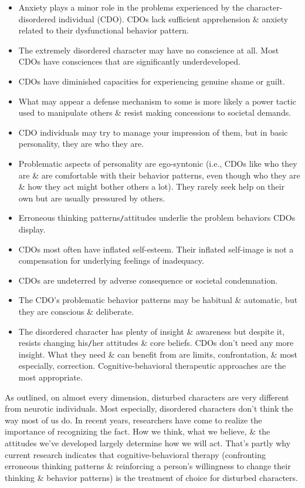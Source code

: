 \documentclass{article}
\numberwithin{equation}{section}
\begin{document}
\begin{itemize}
	\item Anxiety plays a minor role in the problems experienced by the character-disordered individual (CDO). CDOs lack sufficient apprehension \& anxiety related to their dysfunctional behavior pattern.
	\item The extremely disordered character may have no conscience at all. Most CDOs have consciences that are significantly underdeveloped.
	\item CDOs have diminished capacities for experiencing genuine shame or guilt.
	\item What may appear a defense mechanism to some is more likely a power tactic used to manipulate others \& resist making concessions to societal demands.
	\item CDO individuals may try to manage your impression of them, but in basic personality, they are who they are.
	\item Problematic aspects of personality are ego-syntonic (i.e., CDOs like who they are \& are comfortable with their behavior patterns, even though who they are \& how they act might bother others a lot). They rarely seek help on their own but are usually pressured by others.
	\item Erroneous thinking patterns\texttt{/}attitudes underlie the problem behaviors CDOs display.
	\item CDOs most often have inflated self-esteem. Their inflated self-image is not a compensation for underlying feelings of inadequacy.
	\item CDOs are undeterred by adverse consequence or societal condemnation.
	\item The CDO's problematic behavior patterns may be habitual \& automatic, but they are conscious \& deliberate.
	\item The disordered character has plenty of insight \& awareness but despite it, resists changing his\texttt{/}her attitudes \& core beliefs. CDOs don't need any more insight. What they need \& can benefit from are limits, confrontation, \& most especially, correction. Cognitive-behavioral therapeutic approaches are the most appropriate.
\end{itemize}
As outlined, on almost every dimension, disturbed characters are very different from neurotic individuals. Most especially, disordered characters don't think the way most of us do. In recent years, researchers have come to realize the importance of recognizing the fact. How we think, what we believe, \& the attitudes we've developed largely determine how we will act. That's partly why current research indicates that cognitive-behavioral therapy (confronting erroneous thinking patterns \& reinforcing a person's willingness to change their thinking \& behavior patterns) is the treatment of choice for disturbed characters.
\end{document}
